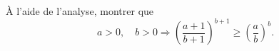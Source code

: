 À l'aide de l'analyse, montrer que
\[ a > 0,\quad b > 0 \Rightarrow \left(\frac{a + 1}{b + 1}\right)^{b+1} \geq \left(\frac{a}{b}\right)^b. \]
